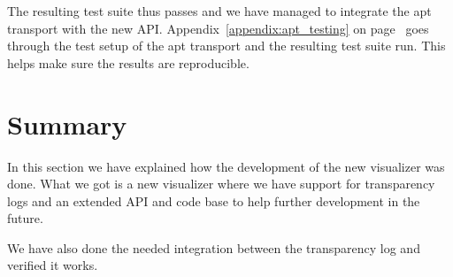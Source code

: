 \documentclass[../Main/thesis.tex]{subfiles}
\begin{document}
The resulting test suite thus passes and we have managed to integrate the apt
transport with the new API. Appendix~\ref{appendix:apt_testing} on
page~\pageref{appendix:apt_testing} goes through the test setup of the apt
transport and the resulting test suite run. This helps make sure the results are
reproducible.

\section*{Summary}\label{sec:development-summary}
In this section we have explained how the development of the new visualizer was
done. What we got is a new visualizer where we have support for transparency
logs and an extended API and code base to help further development in the
future.

We have also done the needed integration between the transparency log and
verified it works.
\end{document}
